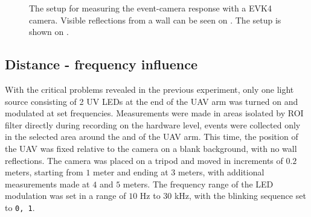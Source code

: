 \begin{figure}[H]
	\centering
	\caption{
  The setup for measuring the event-camera response with a EVK4 camera. Visible reflections from a wall can be seen on . The setup is shown on .
  }
	\label{fig:meas1}
\end{figure}


\subsection{Distance - frequency influence}

With the critical problems revealed in the previous experiment, only one light source consisting of 2 \ac{UV} \ac{LED}s at the end of the \ac{UAV} arm was turned on and
modulated at set frequencies.
Measurements were made in areas isolated by \ac{ROI} filter directly during recording on the hardware level, events were collected only in the
selected area around the and of the \ac{UAV} arm.
This time, the position of the \ac{UAV} was fixed relative to the camera on a blank background, with no wall reflections. The camera was placed on a tripod
and moved in increments of $0.2$ meters, starting from $1$ meter and ending at $3$ meters, with additional measurements made
at $4$ and $5$ meters.
The frequency range of the LED modulation was set in a range of $10$ Hz to $30$ kHz, with the blinking sequence set to \texttt{0, 1}.

